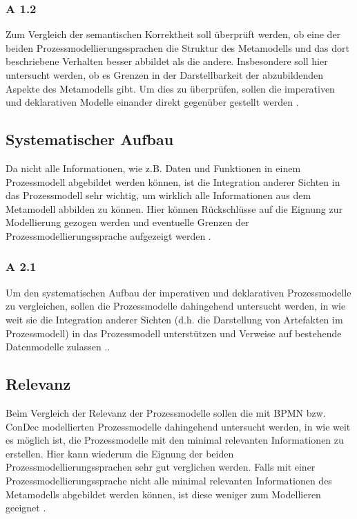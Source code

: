 \subsubsection{A 1.2}

Zum Vergleich der semantischen Korrektheit soll überprüft werden, ob eine der beiden Prozessmodellierungssprachen die Struktur des Metamodells und das dort beschriebene Verhalten besser abbildet als die andere. Insbesondere soll hier untersucht werden, ob es Grenzen in der Darstellbarkeit der abzubildenden Aspekte des Metamodells gibt. Um dies zu überprüfen, sollen die imperativen und deklarativen Modelle einander direkt gegenüber gestellt werden \cite{journals95, becker2012prozessmanagement}. \newline
\subsection{Systematischer Aufbau}

Da nicht alle Informationen, wie z.B. Daten und Funktionen in einem Prozessmodell abgebildet werden können, ist die Integration anderer Sichten in das Prozessmodell sehr wichtig, um wirklich alle Informationen aus dem Metamodell abbilden zu können. Hier können Rückschlüsse auf die Eignung zur Modellierung gezogen werden und eventuelle Grenzen der Prozessmodellierungssprache aufgezeigt werden \cite{journals95, freund2007, becker2012prozessmanagement,koch2011}.

\subsubsection{A 2.1}
Um den systematischen Aufbau der imperativen und deklarativen Prozessmodelle zu vergleichen, sollen die Prozessmodelle dahingehend untersucht werden, in wie weit sie die Integration anderer Sichten (d.h. die Darstellung von Artefakten im Prozessmodell) in das Prozessmodell unterstützen und Verweise auf bestehende Datenmodelle zulassen \cite{journals95, freund2007,reinshagen2009}.. 

\subsection{Relevanz}

Beim Vergleich der Relevanz der Prozessmodelle sollen die mit BPMN bzw. ConDec modellierten Prozessmodelle dahingehend untersucht werden, in wie weit es möglich ist, die Prozessmodelle mit den minimal relevanten Informationen zu erstellen. Hier kann wiederum die Eignung der beiden Prozessmodellierungssprachen sehr gut verglichen werden. Falls mit einer Prozessmodellierungssprache nicht alle minimal relevanten Informationen des Metamodells abgebildet werden können, ist diese weniger zum Modellieren geeignet \cite{journals95, freund2007,reinshagen2009}. 

